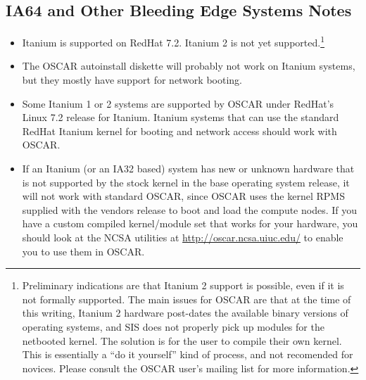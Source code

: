 
\subsection{IA64 and Other Bleeding Edge Systems Notes}
\label{subsec:ia64notes}

\begin{itemize}
  
\item Itanium is supported on RedHat 7.2.  Itanium 2 is not yet
  supported.\footnote{Preliminary indications are that Itanium 2
    support is possible, even if it is not formally supported.  The
    main issues for OSCAR are that at the time of this writing,
    Itanium 2 hardware post-dates the available binary versions of
    operating systems, and SIS does not properly pick up modules for
    the netbooted kernel.  The solution is for the user to compile
    their own kernel.  This is essentially a ``do it yourself'' kind
    of process, and not recomended for novices.  Please consult the
    OSCAR user's mailing list for more information.}

\item The OSCAR autoinstall diskette will probably not work on Itanium
  systems, but they mostly have support for network booting.
  
\item Some Itanium 1 or 2 systems are supported by OSCAR under
  RedHat's Linux 7.2 release for Itanium.  Itanium systems that can
  use the standard RedHat Itanium kernel for booting and network
  access should work with OSCAR.
  
\item If an Itanium (or an IA32 based) system has new or unknown
  hardware that is not supported by the stock kernel in the base
  operating system release, it will not work with standard OSCAR,
  since OSCAR uses the kernel RPMS supplied with the vendors release
  to boot and load the compute nodes.  If you have a custom compiled
  kernel/module set that works for your hardware, you should look at
  the NCSA utilities at \url{http://oscar.ncsa.uiuc.edu/} to
  enable you to use them in OSCAR.
\end{itemize}





